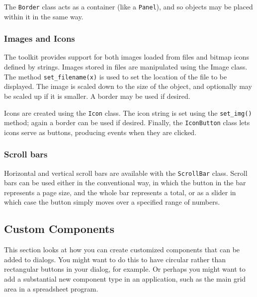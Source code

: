 
The \texttt{Border} class acts as a container (like a \texttt{Panel}),
and so objects may be placed within it in the same way.

\subsubsection{Images and Icons}

The toolkit provides support for both images loaded from files and
bitmap icons defined by strings. Images stored in files are manipulated
using the Image class. The method \texttt{set\_filename(x)} is used to
set the location of the file to be displayed. The image is scaled down
to the size of the object, and optionally may be scaled up if it is
smaller. A border may be used if desired.

Icons are created using the \texttt{Icon} class. The icon string is set
using the \texttt{set\_img()} method; again a border can be used if
desired. Finally, the \texttt{IconButton} class lets icons serve as
buttons, producing events when they are clicked.

\subsubsection{Scroll bars}

Horizontal and vertical scroll bars are available with the
\texttt{ScrollBar} class. Scroll bars can be used either in the
conventional way, in which the button in the bar represents a page
size, and the whole bar represents a total, or as a slider in which
case the button simply moves over a specified range of numbers.

\subsection{Custom Components}

This section looks at how you can create customized components that can
be added to dialogs. You might want to do this to have circular rather
than rectangular buttons in your dialog, for example. Or perhaps you
might want to add a substantial new component type in an application,
such as the main grid area in a spreadsheet program.

